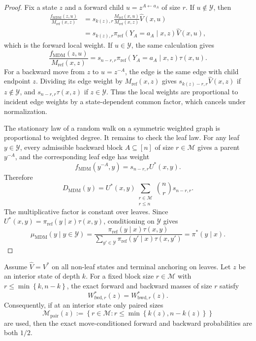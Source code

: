 \documentclass{article}
\numberwithin{theorem}{section}
\numberwithin{proposition}{section}
\numberwithin{corollary}{section}
\numberwithin{lemma}{section}
\numberwithin{conjecture}{section}
\numberwithin{remark}{section}
\numberwithin{definition}{section}
\numberwithin{assumption}{section}
\numberwithin{example}{section}
\newcommand{\calM}{{\mathcal{M}}}
\newcommand{\calY}{{\mathcal{Y}}}
\newcommand{\lbra}[1]{\left[#1\right]}
\newcommand{\mbra}[1]{\left\{#1\right\}}
\providecommand{\base}{\pi_{\mathrm{ref}}}
\begin{document}
\begin{proof}
Fix a state $z$ and a forward child $u=z^{A\leftarrow a_A}$ of size $r$. If $u\notin\calY$, then
\begin{align*}
    \frac{f_{\mathrm{MDM}}(z,u)}{M_{\mathrm{ref}}(x,z)}
    &=s_{k(z),r}\frac{M_{\mathrm{ref}}(x,u)}{M_{\mathrm{ref}}(x,z)}\widehat V(x,u)\\
    &=s_{k(z),r}\base(Y_A=a_A\mid x,z)\widehat V(x,u),
\end{align*}
which is the forward local weight. If $u\in\calY$, the same calculation gives
\begin{equation*}
    \frac{f_{\mathrm{MDM}}(z,u)}{M_{\mathrm{ref}}(x,z)}=s_{n-r,r}\base(Y_A=a_A\mid x,z)\tau(x,u).
\end{equation*}
For a backward move from $z$ to $u=z^{-A}$, the edge is the same edge with child endpoint $z$. Dividing its edge weight by $M_{\mathrm{ref}}(x,z)$ gives $s_{k(z)-r,r}\widehat V(x,z)$ if $z\notin\calY$, and $s_{n-r,r}\tau(x,z)$ if $z\in\calY$. Thus the local weights are proportional to incident edge weights by a state-dependent common factor, which cancels under normalization.

The stationary law of a random walk on a symmetric weighted graph is proportional to weighted degree. It remains to check the leaf law. For any leaf $y\in\calY$, every admissible backward block $A\subseteq\lbra{n}$ of size $r\in\calM$ gives a parent $y^{-A}$, and the corresponding leaf edge has weight
\begin{equation*}
    f_{\mathrm{MDM}}(y^{-A},y)=s_{n-r,r}U^*(x,y).
\end{equation*}
Therefore
\begin{equation*}
    D_{\mathrm{MDM}}(y)=U^*(x,y)\sum_{\substack{r\in\calM\\r\le n}}\binom{n}{r}s_{n-r,r}.
\end{equation*}
The multiplicative factor is constant over leaves. Since $U^*(x,y)=\base(y\mid x)\tau(x,y)$, conditioning on $\calY$ gives
\begin{equation*}
    \mu_{\mathrm{MDM}}(y\mid y\in\calY)=\frac{\base(y\mid x)\tau(x,y)}{\sum_{y'\in\calY}\base(y'\mid x)\tau(x,y')}=\pi^*(y\mid x).
\end{equation*}
\end{proof}

\begin{proposition}
\label{prop:balanced_mdm_directional_balance}
Assume $\widehat V=V^*$ on all non-leaf states and terminal anchoring on leaves. Let $z$ be an interior state of depth $k$. For a fixed block size $r\in\calM$ with $r\le\min\mbra{k,n-k}$, the exact forward and backward masses of size $r$ satisfy
\begin{equation*}
    W_{\mathrm{fwd},r}^*(z)=W_{\mathrm{bwd},r}^*(z).
\end{equation*}
Consequently, if at an interior state only paired sizes
\begin{equation*}
    \calM_{\mathrm{pair}}(z):=\mbra{r\in\calM:r\le\min\mbra{k(z),n-k(z)}}
\end{equation*}
are used, then the exact move-conditioned forward and backward probabilities are both $1/2$.
\end{proposition}
\end{document}
